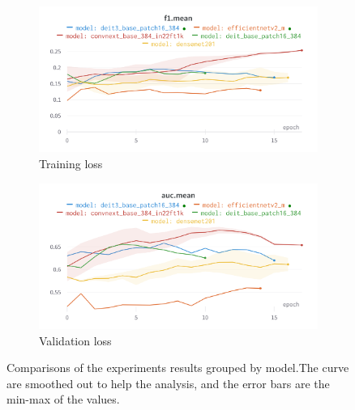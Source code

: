 \documentclass[11pt]{article}
\begin{document}
                \begin{figure}[H]
                     \centering
                     \begin{subfigure}[b]{0.45\textwidth}
                         \centering
                         \includegraphics[width=\textwidth]{plots/model_comparison_f1}
                         \caption{Training loss}
                         \vspace{4ex}
                         \label{fig:model_comparison_f1}
                     \end{subfigure}
                     \hfill
                     \begin{subfigure}[b]{0.45\textwidth}
                         \centering
                         \includegraphics[width=\textwidth]{plots/model_comparison_auc}
                         \caption{Validation loss}
                         \vspace{4ex}
                         \label{fig:model_comparison_auc}
                     \end{subfigure}
                     \label{fig:model_comparison}
                     \caption{Comparisons of the experiments results grouped by model.The curve are smoothed out to help the analysis, and the error bars are the min-max
                         of the values.}
                \end{figure}
\end{document}
